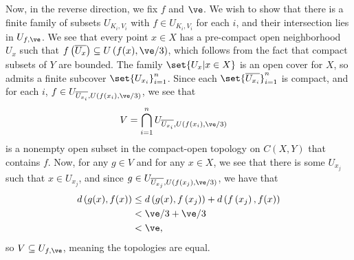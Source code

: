 \documentclass[10pt]{mypackage}
\begin{document}
\begin{solution}
  Now, in the reverse direction, we fix $f$ and $\ve$. We wish to show that there is a finite family of subsets $U_{K_i,V_i}$ with $f\in U_{K_i,V_i}$ for each $i$, and their intersection lies in $U_{f,\ve}$. We see that every point $x\in X$ has a pre-compact open neighborhood $U_x$ such that $f\left( \overline{U_x} \right) \subseteq U\left( f(x),\ve/3 \right)$, which follows from the fact that compact subsets of $Y$ are bounded. The family $\set{U_x | x\in X}$ is an open cover for $X$, so admits a finite subcover $\set{U_{x_i}}_{i=1}^{n}$. Since each $ \set{\overline{U_{x_i}}}_{i=1}^{n} $ is compact, and for each $i$, $f\in U_{ \overline{U_{x_i}},U\left( f\left( x_i \right),\ve/3 \right) }$, we see that
  \begin{align*}
    V &= \bigcap_{i=1}^{n} U_{ \overline{U_{x_i}},U\left( f\left( x_i \right),\ve/3 \right) }
  \end{align*}
  is a nonempty open subset in the compact-open topology on $C\left( X,Y \right)$ that contains $f$. Now, for any $g\in V$ and for any $x\in X$, we see that there is some $U_{x_j}$ such that $x\in U_{x_j}$, and since $g\in U_{ \overline{U_{x_j}},U\left( f\left( x_j \right),\ve/3 \right) }$, we have that
  \begin{align*}
    d\left( g(x),f(x) \right) &\leq d\left( g(x),f\left( x_j \right) \right) + d\left( f\left( x_j \right),f(x) \right)\\
                              &< \ve/3 + \ve/3\\
                              &< \ve,
  \end{align*}
  so $V\subseteq U_{f,\ve}$, meaning the topologies are equal.
\end{solution}
\end{document}
